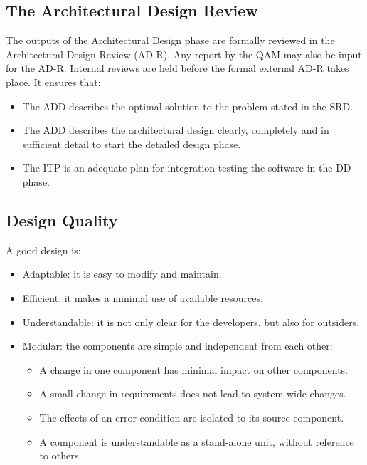 \subsection{The Architectural Design Review}
The outputs of the Architectural Design phase are formally reviewed in the Architectural Design Review (AD-R). Any report by the QAM may also be input for the AD-R. Internal reviews are held before the formal external AD-R takes place. It ensures that:
\begin{itemize}
	\item The ADD describes the optimal solution to the problem stated in the SRD.
	\item The ADD describes the architectural design clearly, completely and in sufficient detail to start the detailed design phase.
	\item  The ITP is an adequate plan for integration testing the software in the DD phase.
\end{itemize}

\subsection{Design Quality}
A good design is:
\begin{itemize}
	\item Adaptable: it is easy to modify and maintain.
	\item  Efficient: it makes a minimal use of available resources.
	\item  Understandable: it is not only clear for the developers, but also for outsiders.
	\item  Modular: the components are simple and independent from each other:
	\begin{itemize}
		\item  A change in one component has minimal impact on other components.
		\item A small change in requirements does not lead to system wide changes.
		\item  The effects of an error condition are isolated to its source component.
		\item A component is understandable as a stand-alone unit, without reference to others.
	\end{itemize}
\end{itemize}

